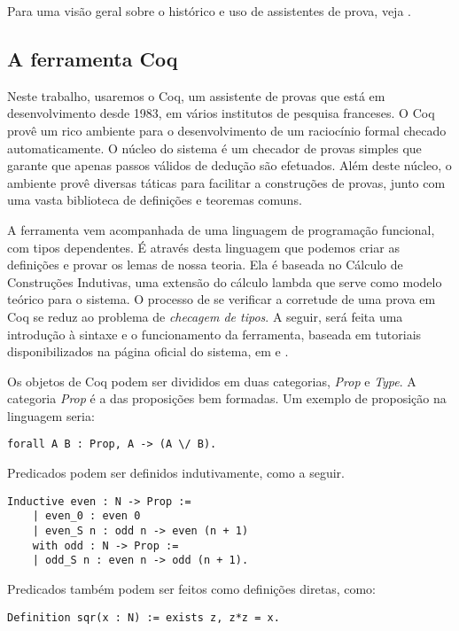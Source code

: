 Para uma visão geral sobre o histórico e uso de assistentes de prova, veja
\cite{proof_assist}. 

\subsection{A ferramenta Coq}

Neste trabalho, usaremos o Coq, um assistente de provas que está em
desenvolvimento desde 1983, em vários institutos de pesquisa franceses. O Coq
provê um rico ambiente para o desenvolvimento de um raciocínio formal checado
automaticamente. O núcleo do sistema é um checador de provas simples que garante
que apenas passos válidos de dedução são efetuados. Além deste núcleo, o
ambiente provê diversas táticas para facilitar a construções de provas, junto
com uma vasta biblioteca de definições e teoremas comuns.

A ferramenta vem acompanhada de uma linguagem de programação funcional, com
tipos dependentes. É através desta linguagem que podemos criar as definições e
provar os lemas de nossa teoria. Ela é baseada no Cálculo de Construções
Indutivas, uma extensão do cálculo lambda que serve como modelo teórico para o
sistema. O processo de se verificar a corretude de uma prova em Coq se reduz ao
problema de \emph{checagem de tipos}. A seguir, será feita uma introdução à
sintaxe e o funcionamento da ferramenta, baseada em tutoriais disponibilizados
na página oficial do sistema, em \cite{coq} e \cite{coq2}.


Os objetos de Coq podem ser divididos em duas categorias, \emph{Prop} e
\emph{Type}. A categoria \emph{Prop} é a das proposições bem formadas. Um
exemplo de proposição na linguagem seria:

\begin{lstlisting}[basicstyle=\small]
    forall A B : Prop, A -> (A \/ B).
\end{lstlisting}

Predicados podem ser definidos indutivamente, como a seguir.

\begin{lstlisting}[basicstyle=\small]
    Inductive even : N -> Prop :=
    | even_0 : even 0
    | even_S n : odd n -> even (n + 1)
    with odd : N -> Prop :=
    | odd_S n : even n -> odd (n + 1).
\end{lstlisting}

Predicados também podem ser feitos como definições diretas, como:

\begin{lstlisting}[basicstyle=\small]
    Definition sqr(x : N) := exists z, z*z = x.
\end{lstlisting}

